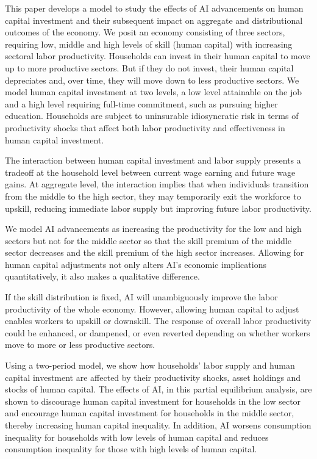 \documentclass[12pt]{article}
\begin{document}
This paper develops a model to study the effects of AI advancements on human capital investment and their subsequent impact on aggregate and distributional outcomes of the economy. We posit an economy consisting of three sectors, requiring low, middle and high levels of skill (human capital) with increasing sectoral labor productivity. Households can invest in their human capital to move up to more productive sectors. But if they do not invest, their human capital depreciates and, over time, they will move down to less productive sectors. We model human capital investment at two levels, a low level attainable on the job and a high level requiring full-time commitment, such as pursuing higher education. Households are subject to uninsurable idiosyncratic risk in terms of productivity shocks that affect both labor productivity and effectiveness in human capital investment. 


The interaction between human capital investment and labor supply presents a tradeoff at the household level between current wage earning and future wage gains. At aggregate level, the interaction implies that when individuals transition from the middle to the high sector, they may temporarily exit the workforce to upskill, reducing immediate labor supply but improving future labor productivity. 


We model AI advancements as increasing the productivity for the low and high sectors but not for the middle sector so that the skill premium of the middle sector decreases and the skill premium of the high sector increases. Allowing for human capital adjustments not only alters AI’s economic implications quantitatively, it also makes a qualitative difference. 


If the skill distribution is fixed, AI will unambiguously improve the labor productivity of the whole economy. However, allowing human capital to adjust enables workers to upskill or downskill. The response of overall labor productivity could be enhanced, or dampened, or even reverted depending on whether workers move to more or less productive sectors.


Using a two-period model, we show how households’ labor supply and human capital investment are affected by their productivity shocks, asset holdings and stocks of human capital. The effects of AI, in this partial equilibrium analysis, are shown to discourage human capital investment for households in the low sector and encourage human capital investment for households in the middle sector, thereby increasing human capital inequality. In addition, AI worsens consumption inequality for households with low levels of human capital and reduces consumption inequality for those with high levels of human capital.
\end{document}
